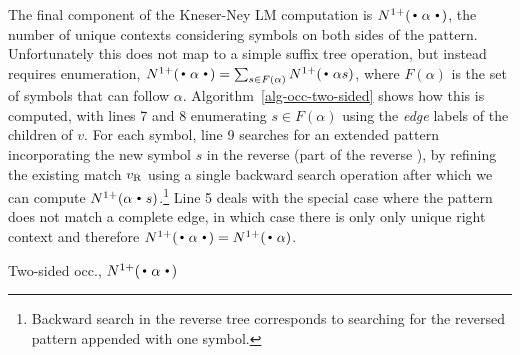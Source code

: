 The final component of the Kneser-Ney LM computation is
$\nlplus{\dotpatdot}$, the number of unique contexts considering
symbols on both sides of the pattern. 
Unfortunately this does not map to a simple suffix tree operation,
but instead requires enumeration,
$\nlplus{\dotpatdot} = \sum_{s \in F(\alpha)} \nlplus{\dotpat s}$, 
where $F(\alpha)$ is the set of symbols that can follow $\alpha$.
Algorithm~\ref{alg-occ-two-sided} shows how this is computed, with lines 7 and 8 enumerating $s \in F(\alpha)$ using the \emph{edge} labels of the children of $v$.
For each symbol, line 9 searches for an extended pattern incorporating
the new symbol $s$ in the reverse \CSA (part of the reverse \CST), by
refining the existing match $v_{\text{R}}$ using a single backward search
operation after which we can compute $\nlplus{\patdot
  s}$.\footnote{Backward search in the reverse tree corresponds to
  searching for the reversed pattern appended with one symbol.}
Line 5 deals with the special case where the pattern does not match a complete edge, in which case there is only only unique right context and therefore $\nlplus{\dotpatdot} = \nlplus{\dotpat}$.

\begin{algorithm}[t]
  \caption{Two-sided occ., $\nlplus{\dotpatdot}$ 
    \label{alg:n1plusfb}}
\footnotesize
  \begin{algorithmic}[1]
        \Else
           \For{$\chf \gets \children{\tf}{\nf}$} 
            \EndFor
        \EndIf
      \State {}
    \EndFunction
  \end{algorithmic}
\label{alg-occ-two-sided}
\end{algorithm}

